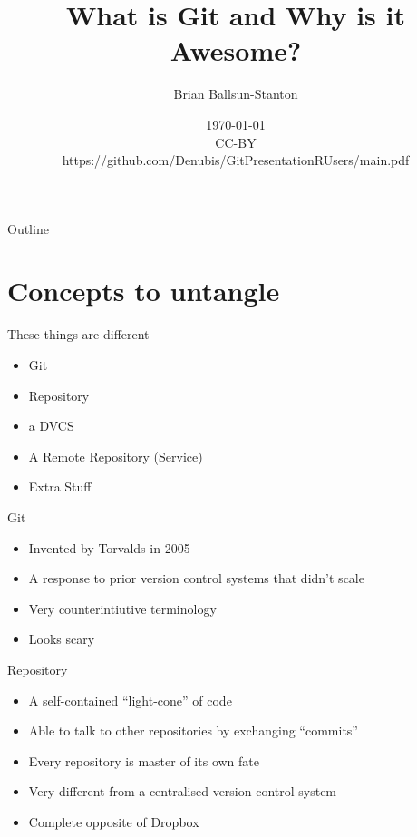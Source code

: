 \documentclass[aspectratio=1610]{beamer} %
\title{What is Git and Why is it Awesome?} %
\author{Brian Ballsun-Stanton}               %
\institute{Solutions Architect (Digital Humanities), Faculty of Arts}         %
\date{\today\\CC-BY\\https://github.com/Denubis/GitPresentationRUsers/main.pdf}                 %
\begin{document}
\begin{frame}
  \titlepage  
\end{frame}

\begin{frame}{Outline}
  \tableofcontents
\end{frame}

%

\section{Concepts to untangle}

\begin{frame}{These things are different}
  
    \begin{itemize}
    \item Git
    \item Repository
    \item a DVCS
    \item A Remote Repository (Service)
    \item Extra Stuff
  \end{itemize}
\end{frame}


\begin{frame}{Git}
  
    \begin{itemize}
    \item Invented by Torvalds in 2005
    \item A response to prior version control systems that didn't scale
    \item Very counterintiutive terminology
    \item Looks scary    
  \end{itemize}
\end{frame}

\begin{frame}{Repository}
  
    \begin{itemize}
    \item A self-contained ``light-cone'' of code
    \item Able to talk to other repositories by exchanging ``commits''
    \item Every repository is master of its own fate
    \item Very different from a centralised version control system
    \item Complete opposite of Dropbox
  \end{itemize}
\end{frame}
\end{document}
